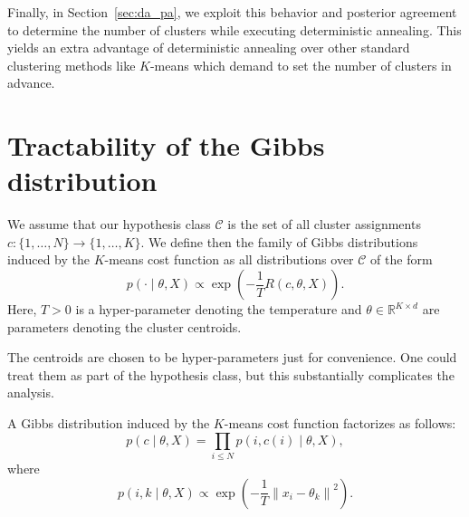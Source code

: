 Finally, in Section~\ref{sec:da_pa}, we exploit this behavior and posterior agreement to determine the number of clusters while executing deterministic annealing. This yields an extra advantage of deterministic annealing over other standard clustering methods like $K$-means which demand to set the number of clusters in advance.

\section{Tractability of the Gibbs distribution}
\label{sec:gibbs_factorizes_da}

We assume that our hypothesis class $\mathcal{C}$ is the set of all cluster assignments $c : \{1, \ldots, N\} \to \{1, \ldots, K\}$.
We define then the family of Gibbs distributions
induced by the $K$-means cost function as all distributions over $\mathcal{C}$ of the
form
%
\begin{equation}
p(\cdot \mid \theta, X) \propto \exp\left(-\frac{1}{T}R(c, \theta, X)\right).
\label{eq:gibbs_distr}
\end{equation}
%
Here, $T > 0$ is a hyper-parameter denoting the temperature and $\theta \in \mathbb{R}^{K \times d}$ are parameters denoting the cluster centroids. 

The centroids are chosen to be hyper-parameters just for convenience.
One could treat them as part of the hypothesis class, but this substantially complicates the analysis.

\begin{theorem}
A Gibbs distribution induced by the $K$-means cost function
factorizes as follows:
%
\begin{equation}
p(c \mid \theta, X) = \prod_{i \leq N} p(i, c(i) \mid \theta, X),
\label{eq:gibbs_distr_factorizes}
\end{equation}
%
where
%
\begin{equation}
p(i, k \mid \theta, X) \propto \exp\left(-\frac{1}{T}\left\|x_i - \theta_{k}\right\|^2\right).
\label{eq:gibbs_factors_da}
\end{equation}
%
\label{thm:gibbs_factorizes}
\end{theorem}

